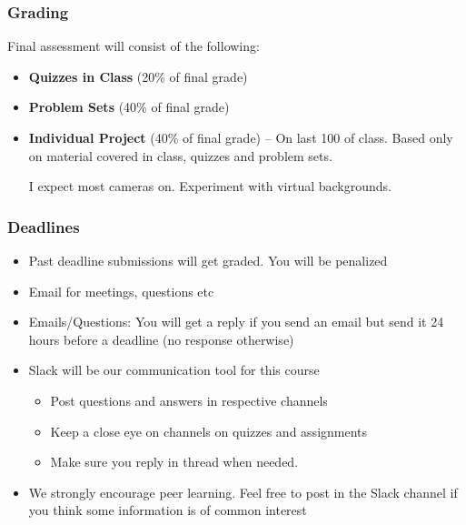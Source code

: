 \documentclass[compress, aspectratio=54]{beamer}
\begin{document}


\begin{frame}
\frametitle{Grading}
Final assessment will consist of the following:
\begin{itemize}
\item \textbf{Quizzes in Class} (20\% of final grade)
\item \textbf{Problem Sets} (40\% of final grade)
\item \textbf{Individual Project}  (40\% of final grade) -- On last 100 of class. Based only on material covered in class, quizzes and problem sets.

I expect most cameras on. Experiment with virtual backgrounds.
\end{itemize}
\end{frame}




\begin{frame}
\frametitle{Deadlines}

\begin{itemize}
\item Past deadline submissions will get graded. You will be penalized 
\item Email for meetings, questions etc 
\item Emails/Questions: You will get a reply if you send an email but send it 24 hours before a deadline (no response otherwise)
\item Slack will be our communication tool for this course
\begin{itemize}
\item Post questions and answers in respective channels
\item Keep a close eye on channels on quizzes and assignments
\item Make sure you reply in thread when needed.
\end{itemize}
\item We strongly encourage peer learning. Feel free to post in the Slack channel if you think some information is of common interest
\end{itemize}

\end{frame}
\end{document}
